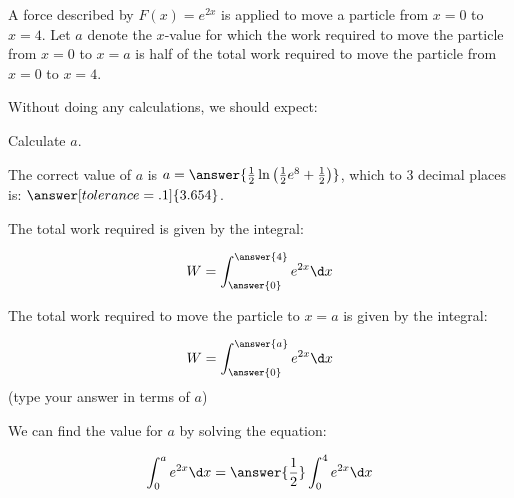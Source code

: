 \documentclass{ximera}
\author{Jim Talamo}
\begin{document}
\begin{exercise}

A force described by $F(x) = e^{2x}$ is applied to move a particle from $x=0$ to $x=4$.  Let $a$ denote the $x$-value for which the work required to move the particle from $x=0$ to $x=a$ is half of the total work required to move the particle from $x=0$ to $x=4$.

Without doing any calculations, we should expect:
\begin{multipleChoice}
\end{multipleChoice}

\begin{exercise}
Calculate $a$.

The correct value of $a$ is $a=\answer{\frac{1}{2} \ln\left(\frac{1}{2}e^8+\frac{1}{2}\right)}$, which to 3 decimal places is: $\answer[tolerance=.1]{3.654}$.

\begin{hint}
The total work required is given by the integral:

\[
W = \int_{\answer{0}}^{\answer{4}} e^{2x} \d x
\]

The total work required to move the particle to $x=a$ is given by the integral:

\[
W = \int_{\answer{0}}^{\answer{a}} e^{2x} \d x
\]
(type your answer in terms of $a$)

\begin{question}
We can find the value for $a$ by solving the equation:

\[
\int_0^a e^{2x} \d x = \answer{\frac{1}{2}} \int_0^4 e^{2x} \d x
\]
\end{question}
\end{hint}

\end{exercise}
\end{exercise}
\end{document}
